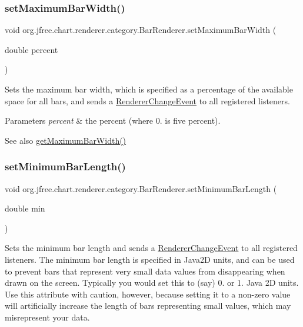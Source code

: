 \subsubsection{\texorpdfstring{set\+Maximum\+Bar\+Width()}{setMaximumBarWidth()}}
{\footnotesize\ttfamily void org.\+jfree.\+chart.\+renderer.\+category.\+Bar\+Renderer.\+set\+Maximum\+Bar\+Width (\begin{DoxyParamCaption}\item[{double}]{percent }\end{DoxyParamCaption})}

Sets the maximum bar width, which is specified as a percentage of the available space for all bars, and sends a \mbox{\hyperlink{}{Renderer\+Change\+Event}} to all registered listeners.


\begin{DoxyParams}{Parameters}
{\em percent} & the percent (where 0. is five percent).\\
\hline
\end{DoxyParams}
\begin{DoxySeeAlso}{See also}
\mbox{\hyperlink{classorg_1_1jfree_1_1chart_1_1renderer_1_1category_1_1_bar_renderer_a0a271c04fe983fa094c5ba531d40d471}{get\+Maximum\+Bar\+Width()}} 
\end{DoxySeeAlso}
\mbox{\label{classorg_1_1jfree_1_1chart_1_1renderer_1_1category_1_1_bar_renderer_a4c13304765f93c80151f181cc96b5ea6}} 
\subsubsection{\texorpdfstring{set\+Minimum\+Bar\+Length()}{setMinimumBarLength()}}
{\footnotesize\ttfamily void org.\+jfree.\+chart.\+renderer.\+category.\+Bar\+Renderer.\+set\+Minimum\+Bar\+Length (\begin{DoxyParamCaption}\item[{double}]{min }\end{DoxyParamCaption})}

Sets the minimum bar length and sends a \mbox{\hyperlink{}{Renderer\+Change\+Event}} to all registered listeners. The minimum bar length is specified in Java2D units, and can be used to prevent bars that represent very small data values from disappearing when drawn on the screen. Typically you would set this to (say) 0. or 1. Java 2D units. Use this attribute with caution, however, because setting it to a non-\/zero value will artificially increase the length of bars representing small values, which may misrepresent your data.


